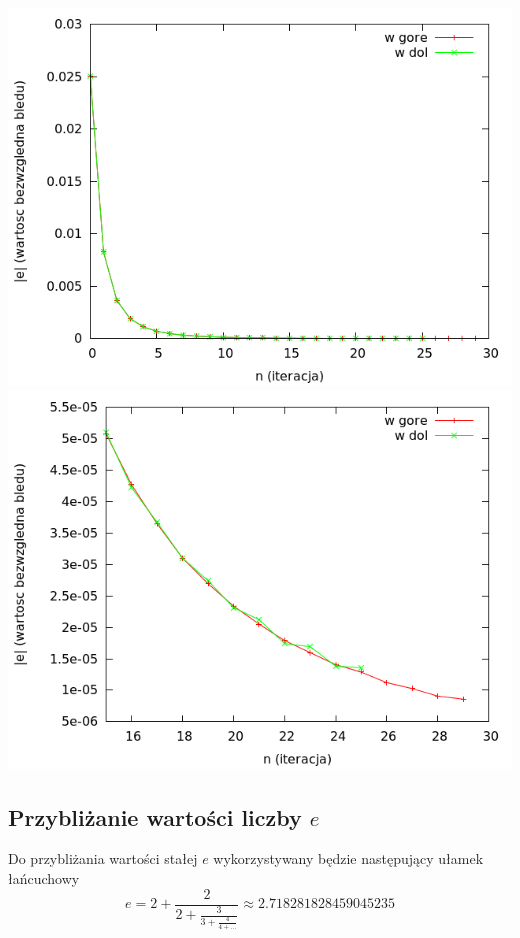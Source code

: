 \documentclass[11pt,leqno]{article}
\begin{document}
\begin{center}
\includegraphics[scale=0.65,natwidth=640,natheight=480]{plot/pi30err.png}\\
\includegraphics[scale=0.65,natwidth=640,natheight=480]{plot/pi30errzoom.png}\\
\end{center}

\subsection{Przybliżanie wartości liczby $e$}
Do przybliżania wartości stałej $e$ wykorzystywany będzie następujący ułamek łańcuchowy
\[
e
=
2 + \frac{2}{\displaystyle
  2 + \frac{3}{\displaystyle
    3 + \frac{4}{\displaystyle
      4 + \dots
    }
  }
}
\approx
2.718281828459045235
\]
\end{document}
